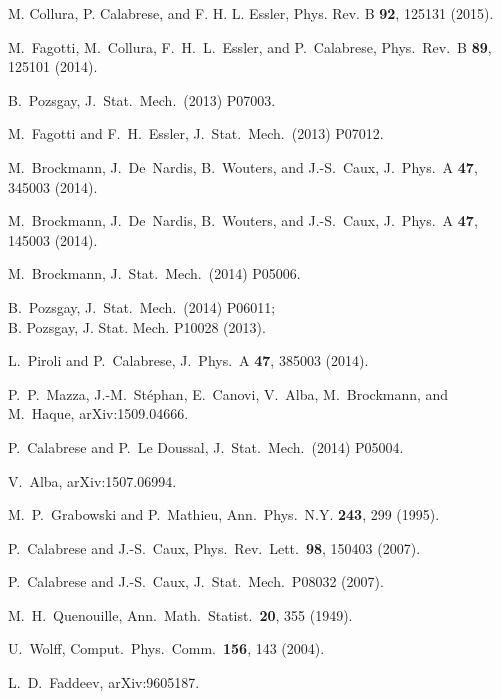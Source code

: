 \documentclass[11pt]{iopart}
\begin{document}
\begin{thebibliography}{99}
M. Collura, P. Calabrese, and F. H. L. Essler, Phys. Rev. B {\bf 92}, 125131 (2015).

M.~Fagotti, M.~Collura, F.~H.~L.~Essler, and P.~Calabrese, Phys.\ Rev.\ B {\bf 89}, 125101 (2014).

B.~Pozsgay, J.\ Stat.\ Mech.\ (2013) P07003. 

M.~Fagotti and F.~H.~Essler, J.\ Stat.\ Mech.\ (2013) P07012. 






M.~Brockmann, J.~De~Nardis, B.~Wouters, and J.-S.~Caux, J.\ Phys.\ A {\bf 47}, 345003 (2014). 

M.~Brockmann, J.~De~Nardis, B.~Wouters, and J.-S.~Caux, J.\ Phys.\ A {\bf 47}, 145003 (2014). 

M.~Brockmann, J.\ Stat.\ Mech.\ (2014) P05006. 

B.~Pozsgay, J.\ Stat.\ Mech.\ (2014) P06011;\\ 
B. Pozsgay, J. Stat. Mech. P10028 (2013).
 

L.~Piroli and P.~Calabrese, J.\ Phys.\ A {\bf 47}, 385003 (2014). 

P.~P.~Mazza, J.-M.~St\'ephan, E.~Canovi, V.~Alba, M.~Brockmann, and M.~Haque,  arXiv:1509.04666.

P.~Calabrese and P.~Le Doussal, J.\ Stat.\ Mech.\ (2014) P05004. 

V.~Alba, arXiv:1507.06994.

M.~P.~Grabowski and P.~Mathieu, Ann.\ Phys.\ N.Y. {\bf 243}, 
299 (1995). 

P.~Calabrese and J.-S.~Caux, Phys.\ Rev.\ Lett.\ {\bf 98}, 150403 (2007).

P.~Calabrese and J.-S.~Caux, J.\ Stat.\ Mech.\ P08032 (2007).




M.~H.~Quenouille, Ann.\ Math.\ Statist.\ {\bf 20}, 355 (1949).

U.~Wolff, Comput.\ Phys.\ Comm.\ {\bf 156}, 143 (2004). 

L.~D.~Faddeev, arXiv:9605187.





\end{thebibliography}
\end{document}
